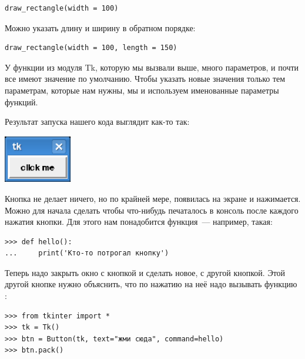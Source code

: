 \begin{listing}
\begin{verbatim}
draw_rectangle(width = 100)
\end{verbatim}
\end{listing}

Можно указать длину и ширину в обратном порядке:

\begin{listing}
\begin{verbatim}
draw_rectangle(width = 100, length = 150)
\end{verbatim}
\end{listing}

У функции  из модуля Tk, которую мы вызвали выше, много параметров, и почти все имеют значение по умолчанию. Чтобы указать новые значения только тем параметрам, которые нам нужны, мы и используем именованные параметры функций.

Результат запуска нашего кода выглядит как-то так:

\begin{center}
\includegraphics*[width=30mm]{../en/figure31.eps}
\end{center}

Кнопка не делает ничего, но по крайней мере, появилась на экране и нажимается. Можно для начала сделать чтобы что-нибудь печаталось в консоль после каждого нажатия кнопки. Для этого нам понадобится функция — например, такая:

\begin{listing}
\begin{verbatim}
>>> def hello():
...     print('Кто-то потрогал кнопку')
\end{verbatim}
\end{listing}

Теперь надо закрыть окно с кнопкой и сделать новое, с другой кнопкой. Этой другой кнопке нужно объяснить, что по нажатию на неё надо вызывать функцию :

\begin{listing}
\begin{verbatim}
>>> from tkinter import *
>>> tk = Tk()
>>> btn = Button(tk, text="жми сюда", command=hello)
>>> btn.pack()
\end{verbatim}
\end{listing}

